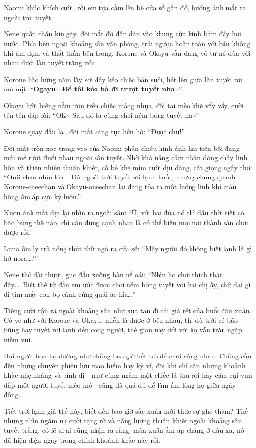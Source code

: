 \documentclass[../main.tex]{subfiles}
\begin{document}
Naomi khúc khích cười, rồi em tựa cằm lên bệ cửa sổ gần đó, hướng ánh mắt ra ngoài trời tuyết.

Nene quấn chăn kín gáy, đôi mắt đờ đẫn dán vào khung cửa kính bám đầy hơi nước. Phía bên ngoài khoảng sân văn phòng, trái ngược hoàn toàn với bầu không khí ảm đạm và thất thần bên trong, Korone và Okayu vẫn đang vô tư nô đùa với nhau dưới làn tuyết trắng xóa.


Korone hào hứng nắm lấy sợi dây kéo chiếc bàn sưởi, hét lên giữa làn tuyết rơi mù mịt: ``\textbf{Ogayu\~{} Để tôi kéo bà đi trượt tuyết nha\~{}}''

Okayu lười biếng nằm ườn trên chiếc mảng nhựa, đôi tai mèo khẽ vẩy vẩy, cười tẻn tẻn đáp lời: ``OK\~{} Sau đó ta cùng chơi ném bóng tuyết na\~{}''

Korone quay đầu lại, đôi mắt sáng rực hớn hở: ``Được chứ!''

Đôi mắt tròn xoe trong veo của Naomi phản chiếu hình ảnh hai tiền bối đang mải mê rượt đuổi nhau ngoài sân tuyết. Nhờ khả năng cảm nhận dòng chảy linh hồn và thiên nhiên thuần khiết, cô bé khẽ mỉm cười dịu dàng, cất giọng ngây thơ: ``Onii-chan nhìn kìa\dots\ Dù ngoài trời tuyết rơi lạnh buốt, nhưng chung quanh Korone-oneechan và Okayu-oneechan lại đang tỏa ra một luồng linh khí màu hồng ấm áp cực kỳ luôn.''

Kuon ánh mắt dịu lại nhìn ra ngoài sân: ``Ừ, với hai đứa nó thì dẫu thời tiết có bão bùng thế nào, chỉ cần đứng cạnh nhau là có thể biến mọi nơi thành sân chơi được rồi.''

Luna ôm ly trà nóng thút thít ngó ra cửa sổ: ``Mấy người đó không biết lạnh là gì hở-nora\dots?''

Nene thở dài thượt, gục đầu xuống bàn uể oái: ``Nhìn họ chơi thích thật đấy\dots\ Biết thế từ đầu em ước được chơi ném bóng tuyết với hai chị ấy, chứ dại gì đi tìm mấy con bọ cánh cứng quái ác kia\dots''

Tiếng cười rộn rã ngoài khoảng sân như xua tan đi cái giá rét của buổi đầu xuân. Có vẻ như với Korone và Okayu, miễn là được ở bên nhau, thì dù trời có bão bùng hay tuyết rơi lạnh đến cóng người, thế gian này đối với họ vẫn tràn ngập niềm vui.

Hai người bọn họ dường như chẳng bao giờ hết trò để chơi cùng nhau. Chẳng cần đến những chuyến phiêu lưu mạo hiểm hay kỳ vĩ, đôi khi chỉ cần những khoảnh khắc nhẹ nhàng và bình dị - như cùng ngắm một chiếc lá thu rơi hay cặm cụi vun đắp một người tuyết méo mó - cũng đã quá đủ để làm ấm lòng họ giữa ngày đông.

Tiết trời lạnh giá thế này, biết đến bao giờ sắc xuân mới thực sự ghé thăm? Thế nhưng nhìn ngắm nụ cười rạng rỡ và năng lượng thuần khiết ngoài khoảng sân tuyết trắng, có lẽ ai ai cũng nhận ra rằng: mùa xuân ấm áp chẳng ở đâu xa, nó đã hiện diện ngay trong chính khoảnh khắc này rồi.
\end{document}
